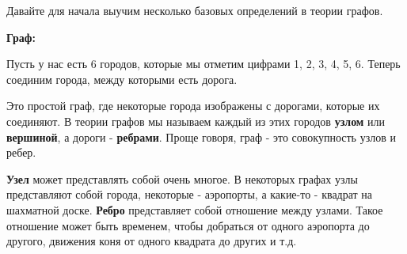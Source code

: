 \vspace{\baselineskip}
Давайте для начала выучим несколько базовых определений в теории графов.

\vspace{\baselineskip}
\textbf{Граф:}

\vspace{\baselineskip}
Пусть у нас есть 6 городов, которые мы отметим цифрами 1, 2, 3, 4, 5, 6. Теперь соединим города, между которыми есть дорога.


Это простой граф, где некоторые города изображены с дорогами, которые их соединяют. В теории графов мы называем каждый из этих городов \textbf{узлом} или \textbf{вершиной}, а дороги - \textbf{ребрами}. Проще говоря, граф - это совокупность узлов и ребер.

\vspace{\baselineskip}
\textbf{Узел} может представлять собой очень многое. В некоторых графах узлы представляют собой города, некоторые - аэропорты, а какие-то -  квадрат на шахматной доске. \textbf{Ребро} представляет собой отношение между узлами. Такое отношение может быть временем, чтобы добраться от одного аэропорта до другого, движения коня от одного квадрата до других  и т.д.